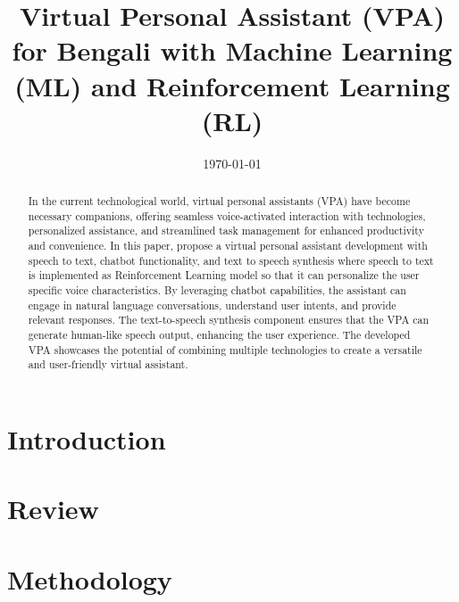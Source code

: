 \documentclass[conference]{IEEEtran}
\title{Virtual Personal Assistant (VPA) for Bengali with Machine Learning (ML) and Reinforcement Learning (RL)}
\author{\IEEEauthorblockN{Sadidul Islam}
\IEEEauthorblockA{\textit{Student, MSCSE} \\
\textit{United Internation University}\\
Bangladesh \\
sadid@soceton.com}
}
\date{\today}
\begin{document}
\maketitle

\begin{abstract}
    In the current technological world, virtual personal assistants (VPA) have become necessary companions, offering seamless voice-activated interaction with technologies, personalized assistance, and streamlined task management for enhanced productivity and convenience.
    In this paper, propose a virtual personal assistant development with speech to text, chatbot functionality, and text to speech synthesis where speech to text is implemented as Reinforcement Learning model so that it can personalize the user specific voice characteristics.
    By leveraging chatbot capabilities, the assistant can engage in natural language conversations, understand user intents, and provide relevant responses.
    The text-to-speech synthesis component ensures that the VPA can generate human-like speech output, enhancing the user experience.
    The developed VPA showcases the potential of combining multiple technologies to create a versatile and user-friendly virtual assistant.
\end{abstract}

\section{Introduction}\label{sec:introduction}


\section{Review}\label{sec:review}


\section{Methodology}\label{sec:methodology}



\end{document}
